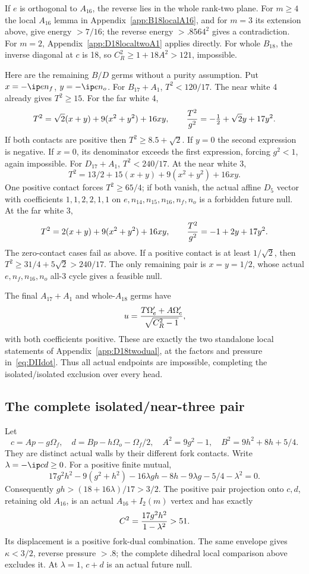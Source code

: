 If \(e\) is orthogonal to \(A_{16}\), the reverse lies in the whole
rank-two plane.  For \(m\ge4\) the local \(A_{16}\) lemma in
Appendix~\ref{app:B18localA16}, and for \(m=3\) its extension
above, give energy \(>7/16\); the reverse energy
\(>.8564^2\) gives a contradiction.
For \(m=2\), Appendix~\ref{app:D18localtwoA1} applies directly.
For whole \(B_{18}\), the inverse diagonal at \(c\) is 18, so
\(C_R^2\ge1+18A^2>121\), impossible.

Here are the remaining \(B/D\) germs without a purity assumption.
Put \(x=-\ip e{n_f}\), \(y=-\ip e{n_o}\).
For \(B_{17}+A_1\), \(T^2<120/17\).
The near white 4 already gives \(T^2\ge15\).
For the far white 4,
\[
 T^2=\sqrt2(x+y)+9(x^2+y^2)+16xy,\qquad
 {T^2\over g^2}=-\tfrac12+\sqrt2y+17y^2 .
\]
If both contacts are positive then \(T^2\ge8.5+\sqrt2\).
If \(y=0\) the second expression is negative.
If \(x=0\), its denominator exceeds the first expression, forcing
\(g^2<1\), again impossible.
For \(D_{17}+A_1\), \(T^2<240/17\).
At the near white 3,
\[
 T^2=13/2+15(x+y)+9(x^2+y^2)+16xy .
\]
One positive contact forces \(T^2\ge65/4\); if both vanish,
the actual affine \(D_5\) vector with coefficients \(1,1,2,2,1,1\)
on \(e,n_{14},n_{15},n_{16},n_f,n_o\) is a forbidden future null.
At the far white 3,
\[
 T^2=2(x+y)+9(x^2+y^2)+16xy,\qquad
 {T^2\over g^2}=-1+2y+17y^2 .
\]
The zero-contact cases fail as above.
If a positive contact is at least \(1/\sqrt2\), then
\(T^2\ge31/4+5\sqrt2>240/17\).
The only remaining pair is \(x=y=1/2\), whose actual
\(e,n_f,n_{16},n_o\) all-3 cycle gives a feasible null.

The final \(A_{17}+A_1\) and whole-\(A_{18}\) germs have
\[
 u={T\Omega'_e+A\Omega'_c\over\sqrt{C_R^2-1}},
\]
with both coefficients positive.
These are exactly the two standalone local statements of
Appendix~\ref{app:D18twodual}, at the factors and pressure
in~\eqref{eq:DIIdot}.
Thus all actual endpoints are impossible, completing the
isolated/isolated exclusion over every head.

\subsection{The complete isolated/near-three pair}
\label{app:D18isolatednear}

Let
\[
 c=Ap-g\Omega_f,\quad
 d=Bp-h\Omega_o-\Omega_f/2,\quad
 A^2=9g^2-1,\quad B^2=9h^2+8h+5/4 .
\]
They are distinct actual walls by their different fork contacts.
Write \(\lambda=-\ip cd\ge0\).
For a positive finite mutual,
\[
 17g^2h^2-9(g^2+h^2)-16\lambda gh
       -8h-9\lambda g-5/4-\lambda^2=0.
\]
Consequently \(gh>(18+16\lambda)/17>3/2\).
The positive pair projection onto \(c,d\), retaining old \(A_{16}\),
is an actual \(A_{16}+I_2(m)\) vertex and has exactly
\[
                  C^2={17g^2h^2\over1-\lambda^2}>51.
\]
Its displacement is a positive fork-dual combination.
The same envelope gives \(\kappa<3/2\), reverse pressure \(>.8\);
the complete dihedral local comparison above excludes it.
At \(\lambda=1\), \(c+d\) is an actual future null.

